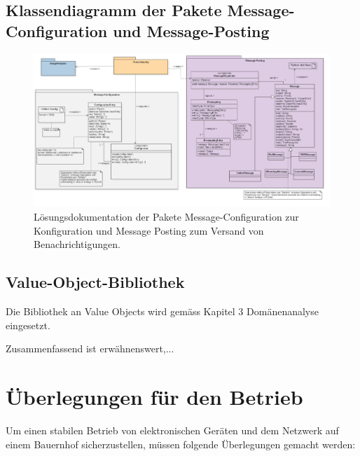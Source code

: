 \begin{landscape}
\subsection{Klassendiagramm der Pakete Message-Configuration und Message-Posting}
\begin{figure}[H]
	\center
	\includegraphics[scale=0.43]{Grafiken/modelle/solution-messaging.jpg}
	\caption{Lösungsdokumentation der Pakete Message-Configuration zur Konfiguration und Message Posting zum Versand von Benachrichtigungen.} 
	\label{fig: Lösungsdokumentation der Pakete Message-Configuration zur Konfiguration und Message Posting zum Versand von Benachrichtigungen.}
\end{figure}

\subsection{Value-Object-Bibliothek}
Die Bibliothek an Value Objects wird gemäss Kapitel 3 Domänenanalyse eingesetzt.

Zusammenfassend ist erwähnenswert,... 

\end{landscape}
\restoregeometry %

\section{Überlegungen für den Betrieb}

Um einen stabilen Betrieb von elektronischen Geräten und dem Netzwerk auf einem Bauernhof sicherzustellen, müssen folgende Überlegungen gemacht werden:


\newpage


